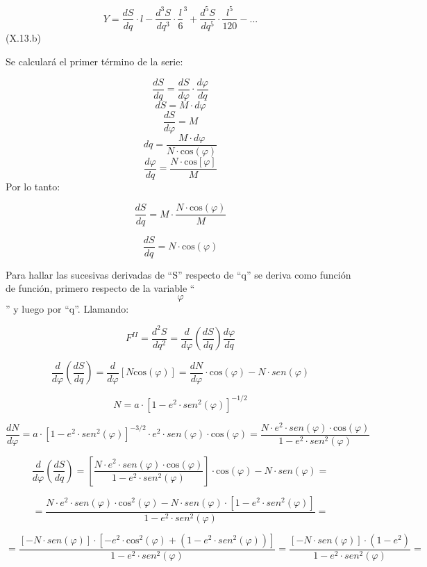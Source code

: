 \documentclass[]{article}
\begin{document}
\[Y=\frac{dS}{dq}\cdot l-\frac{d^3S}{dq^3}\cdot {\frac{l}{6}}^3+\frac{d^5S}{dq^5}\cdot {\frac{l^5}{\text{120}}}-\text{.}\text{.}\text{.}\]
(X.13.b)

Se calculará el primer término de la serie:

\[\frac{dS}{dq}=\frac{dS}{\mathit{d\varphi
}}\cdot {\frac{d\varphi }{dq}}\] \[dS=M\cdot d\varphi \]
\[\frac{dS}{d\varphi }=M\] \[dq=\frac{M\cdot d\varphi }{N\cdot
\text{cos}\left(\varphi \right)}\] \[\frac{d\varphi }{dq}=\frac{N\cdot
\text{cos}\left[\varphi \right]}{M}\] Por lo tanto:

\[\frac{dS}{dq}=M\cdot {\frac{N\cdot \text{cos}\left(\varphi \right)}{M}}\]

\[\frac{dS}{dq}=N\cdot \text{cos}\left(\varphi \right)\]

Para hallar las sucesivas derivadas de ``S'' respecto de ``q'' se deriva
como función de función, primero respecto de la variable ``
\[\varphi \]'' y luego por ``q''. Llamando:

\[F^{II}=\frac{d^2S}{dq^2}=\frac{d}{d\varphi}\left(\frac{dS}{dq}\right)\frac{d\varphi}{dq}\]

\[\frac{d}{d\varphi}\left(\frac{dS}{dq}\right)=\frac{d}{d\varphi}\left[N\text{cos}\left(\varphi \right)\right]=\frac{dN}{d\varphi}\cdot \text{cos}\left(\varphi \right)-N\cdot sen\left(\varphi \right)\]

\[N=a\cdot \left[1-e^2\cdot sen^2\left(\varphi \right)\right]^{-1/2}\]

\[\frac{dN}{d\varphi }=a\cdot \left[1-e^2\cdot sen^2\left(\varphi \right)\right]^{-3/2}\cdot e^2\cdot sen\left(\varphi \right)\cdot \text{cos}\left(\varphi \right)=\frac{N\cdot e^2\cdot sen\left(\varphi \right)\cdot \text{cos}\left(\varphi \right)}{1-e^2\cdot sen^2\left(\varphi \right)}\]

\[\frac{d}{d\varphi}\left(\frac{dS}{dq}\right)=\left[\frac{N\cdot e^2\cdot sen\left(\varphi \right)\cdot \text{cos}\left(\varphi \right)}{1-e^2\cdot sen^2\left(\varphi \right)}\right]\cdot \text{cos}\left(\varphi \right)-N\cdot sen\left(\varphi \right)=\]

\[=\frac{N\cdot e^2\cdot sen\left(\varphi \right)\cdot \text{cos}^2\left(\varphi \right)-N\cdot sen\left(\varphi \right)\cdot \left[1-e^2\cdot sen^2\left(\varphi \right)\right]}{1-e^2\cdot sen^2\left(\varphi \right)}=\]

\[=\frac{\left[-N\cdot sen\left(\varphi \right)\right]\cdot \left[-e^2\cdot \text{cos}^2\left(\varphi \right)+\left(1-e^2\cdot sen^2\left(\varphi \right)\right)\right]}{1-e^2\cdot sen^2\left(\varphi \right)}=\frac{\left[-N\cdot sen\left(\varphi \right)\right]\cdot \left(1-e^2\right)}{1-e^2\cdot sen^2\left(\varphi \right)}=\]
\end{document}
